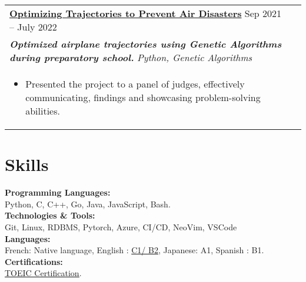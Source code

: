 \documentclass[a4paper,8pt]{article}
\begin{document}
\begin{tabularx}{\linewidth}{ @{}l r@{} }
\color[HTML]{1C033C} \uline{\textbf{{Optimizing Trajectories to Prevent Air Disasters}}} \hfill \color[HTML]{371e77} Sep 2021 – July 2022 \\[4pt]
\color[HTML]{371e77}\textbf{\textit{Optimized airplane trajectories using Genetic Algorithms during preparatory school.}} \hfill \color[HTML]{4B28A4} \textit{Python, Genetic Algorithms} \\[5pt]
\begin{minipage}[t]{\linewidth}
    \begin{itemize}[nosep,after=\strut, leftmargin=2em, itemsep=2pt]
        \item Presented the project to a panel of judges, effectively communicating, findings and showcasing problem-solving abilities.
    \end{itemize}
\end{minipage}
\end{tabularx}


\section{Skills}
\color[HTML]{1C033C}\textbf{Programming Languages:} \\[2pt]
\color[HTML]{371e77} \hspace*{4ex} Python, C, C++, Go, Java, JavaScript, Bash.\\[3pt]
\color[HTML]{1C033C}\textbf{Technologies \& Tools:} \\[2pt]
\color[HTML]{371e77} \hspace*{4ex} Git, Linux,  RDBMS, Pytorch, Azure, CI/CD, NeoVim, VSCode\\[3pt]
\color[HTML]{1C033C}
\color[HTML]{1C033C}\textbf{Languages:}\\[2pt]
\color[HTML]{371e77} \hspace*{4ex} French: Native language, English : \href{https://en.wikipedia.org/wiki/Common_European_Framework_of_Reference_for_Languages}{C1/ B2}, Japanese: A1, Spanish : B1.\\[3pt]
\color[HTML]{1C033C}
\textbf{Certifications:} \\[2pt]
\color[HTML]{371e77} \hspace*{4ex} \uline{\href{https://www.etsglobal.org/fr/en/digital-score-report/BC40227910E1EABF669216AA9C683841118BC0B96B995BE953A367EAC7EDB784aHBBOGFBQnFyU3ViNTBoRXBjQ2Rmekt3VkdxOHIzRzBZTGpWNFVGYytuUnZ0TTdS}{TOEIC Certification}}. \\[3pt]
\end{document}
